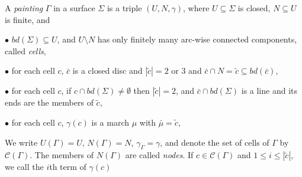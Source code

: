 A \textit{painting} $\Gamma$ in a surface $\Sigma$ is a triple $(U, N, \gamma)$, where $U \subseteq \Sigma$ is closed, $N \subseteq U$ is finite, and

\hspace*{12pt}$\bullet$ $bd(\Sigma) \subseteq U$, and $U \setminus N$ has only finitely many arc-wise connected components, called \textit{cells},

\hspace*{12pt}$\bullet$ for each cell $c$, $\bar{c}$ is a closed disc and $|\tilde{c}| = 2$ or 3 and $\bar{c} \cap N = \tilde{c} \subseteq bd(\bar{c})$,

\hspace*{12pt}$\bullet$ for each cell $c$, if $c \cap bd(\Sigma) \ne \emptyset$ then $|\tilde{c}| = 2$, and $\bar{c} \cap bd(\Sigma)$ is a line and its ends are the members of $\tilde{c}$,

\hspace*{12pt}$\bullet$ for each cell $c$, $\gamma(c)$ is a march $\mu$ with $\bar{\mu} = \tilde{c}$,

We write $U(\Gamma) = U$, $N(\Gamma) = N$, $\gamma_\Gamma = \gamma$, and denote the set of cells of $\Gamma$ by $\mathcal{C}(\Gamma)$. The members of $N(\Gamma)$ are called \textit{nodes}. If $c \in \mathcal{C}(\Gamma)$ and $1 \le i \le |\tilde{c}|$, we call the $i$th term of $\gamma(c)$
